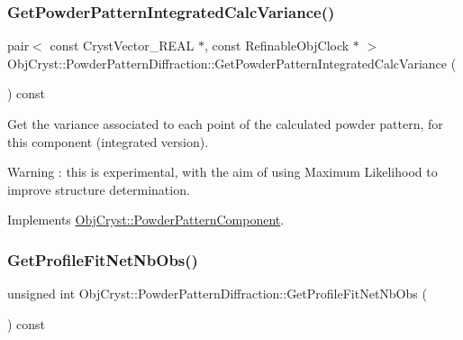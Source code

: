\subsubsection{\texorpdfstring{GetPowderPatternIntegratedCalcVariance()}{GetPowderPatternIntegratedCalcVariance()}}
{\footnotesize\ttfamily pair$<$ const Cryst\+Vector\+\_\+\+R\+E\+AL $\ast$, const Refinable\+Obj\+Clock $\ast$ $>$ Obj\+Cryst\+::\+Powder\+Pattern\+Diffraction\+::\+Get\+Powder\+Pattern\+Integrated\+Calc\+Variance (\begin{DoxyParamCaption}{ }\end{DoxyParamCaption}) const\hspace{0.3cm}{\ttfamily [virtual]}}

Get the variance associated to each point of the calculated powder pattern, for this component (integrated version).

\begin{DoxyWarning}{Warning}
\+: this is experimental, with the aim of using Maximum Likelihood to improve structure determination. 
\end{DoxyWarning}


Implements \mbox{\hyperlink{class_obj_cryst_1_1_powder_pattern_component_ae721bd290b50aa9503bac419616a21c6}{Obj\+Cryst\+::\+Powder\+Pattern\+Component}}.

\mbox{\label{class_obj_cryst_1_1_powder_pattern_diffraction_a0fba98457fffa0aef1d014fb2e7fcbc3}} 
\subsubsection{\texorpdfstring{GetProfileFitNetNbObs()}{GetProfileFitNetNbObs()}}
{\footnotesize\ttfamily unsigned int Obj\+Cryst\+::\+Powder\+Pattern\+Diffraction\+::\+Get\+Profile\+Fit\+Net\+Nb\+Obs (\begin{DoxyParamCaption}{ }\end{DoxyParamCaption}) const}

